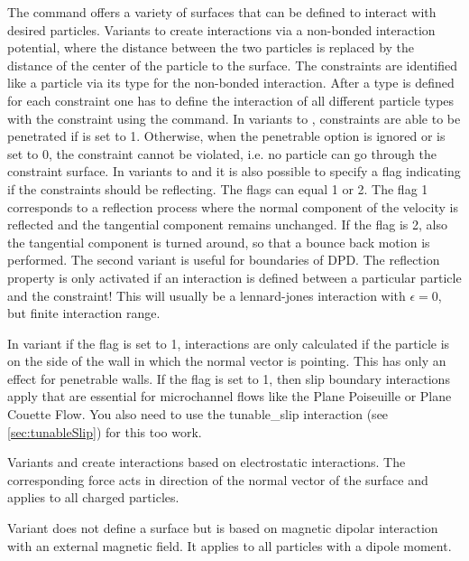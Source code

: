 The  command offers a variety of surfaces that can
be defined to interact with desired particles. Variants  to
 create interactions via a non-bonded interaction
potential, where the distance between the two particles is replaced by
the distance of the center of the particle to the surface. The
constraints are identified like a particle via its type for the
non-bonded interaction.  After a type is defined for each constraint
one has to define the interaction of all different particle types with
the constraint using the  command. In variants
 to , constraints are able to be penetrated if
 is set to 1. Otherwise, when the penetrable option is
ignored or  is set to 0, the constraint cannot be violated,
i.e. no particle can go through the constraint surface.  In variants
 to  and  it is also possible to
specify a flag indicating if the constraints should be reflecting. The
flags can equal 1 or 2.  The flag 1 corresponds to a reflection
process where the normal component of the velocity is reflected and
the tangential component remains unchanged. If the flag is 2, also the
tangential component is turned around, so that a bounce back motion is
performed. The second variant is useful for boundaries of DPD.  The
reflection property is only activated if an interaction is defined
between a particular particle and the constraint! This will usually be
a lennard-jones interaction with $\epsilon=0$, but finite interaction
range.

In variant  if the  flag is set to
1, interactions are only calculated if the particle is on the side of
the wall in which the normal vector is pointing. This has only an
effect for penetrable walls. If the  flag is set
to 1, then slip boundary interactions apply that are essential for
microchannel flows like the Plane Poiseuille or Plane Couette
Flow. You also need to use the tunable_slip interaction (see
\ref{sec:tunableSlip}) for this too work.

Variants  and  create interactions based on electrostatic
interactions. The corresponding force acts in direction of the normal vector of the
surface and applies to all charged particles.

Variant  does not define a surface but is based on magnetic
dipolar interaction with an external magnetic field. It applies to all particles
with a dipole moment.

